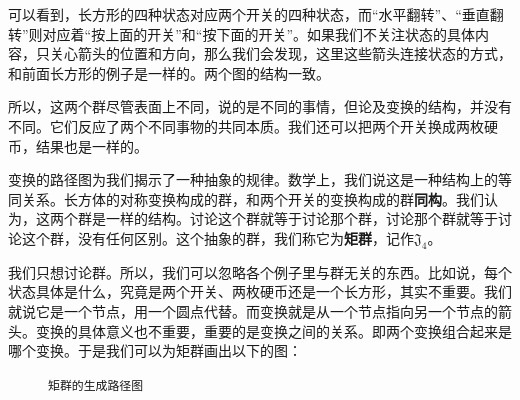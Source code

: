\documentclass[12pt,UTF8,fontset=none]{ctexbook}
\begin{document}
可以看到，长方形的四种状态对应两个开关的四种状态，而“水平翻转”、“垂直翻转”则对应着“按上面的开关”和“按下面的开关”。如果我们不关注状态的具体内容，只关心箭头的位置和方向，那么我们会发现，这里这些箭头连接状态的方式，和前面长方形的例子是一样的。两个图的结构一致。

所以，这两个群尽管表面上不同，说的是不同的事情，但论及变换的结构，并没有不同。它们反应了两个不同事物的共同本质。我们还可以把两个开关换成两枚硬币，结果也是一样的。

变换的路径图为我们揭示了一种抽象的规律。数学上，我们说这是一种结构上的等同关系。长方体的对称变换构成的群，和两个开关的变换构成的群\textbf{同构}。我们认为，这两个群是一样的结构。讨论这个群就等于讨论那个群，讨论那个群就等于讨论这个群，没有任何区别。这个抽象的群，我们称它为\textbf{矩群}，记作$\mathfrak{J}_4$。

我们只想讨论群。所以，我们可以忽略各个例子里与群无关的东西。比如说，每个状态具体是什么，究竟是两个开关、两枚硬币还是一个长方形，其实不重要。我们就说它是一个节点，用一个圆点代替。而变换就是从一个节点指向另一个节点的箭头。变换的具体意义也不重要，重要的是变换之间的关系。即两个变换组合起来是哪个变换。于是我们可以为矩群画出以下的图：

\vspace{12pt}
\begin{figure}[htbp]
    \centering
    \caption{\texttt{矩群的生成路径图}}
\end{figure}
\end{document}
